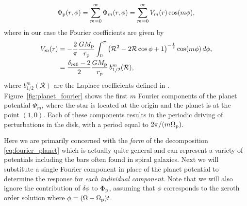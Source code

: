 \begin{align}
    \Phi_{\rm p}(r,\phi) = \sum_{m=0}^\infty \Phi_m (r,\phi) = \sum_{m=0}^\infty V_m (r) \cos (m \phi), \label{eq:fourier_planet}
\end{align}
where in our case the Fourier coefficients are given by 
\begin{align}
    V_m (r) &= - \frac{2}{\pi} \frac{G M_{\rm p}}{r_{\rm p}} \int_0^\pi  \left( \mathcal{R}^2 - 2 \mathcal{R} \cos \phi + 1\right)^{-\frac{1}{2}} \cos (m \phi) \, d\phi, \\
    &= \frac{\delta_{m0} - 2}{2} \frac{G M_{\rm p}}{r_{\rm p}} \, b_{1/2}^m (\mathcal{R}),
\end{align}
where $b_{1/2}^m (\mathcal{R})$ are the Laplace coefficients defined in \citet{brouwer1961}.
Figure~\ref{fig:planet_fourier} shows the first $m$ Fourier components of the planet potential $\Phi_m$, where the star is located at the origin and the planet is at the point $(1,0)$.
Each of these components results in the periodic driving of perturbations in the disk, with a period equal to $2\pi / (m \Omega_{\rm p})$.

Here we are primarily concerned with the \textit{form} of the decomposition \eqref{eq:fourier_planet} which is actually quite general and can represent a variety of potentials including the bars often found in spiral galaxies.
Next we will substitute a single Fourier component in place of the planet potential to determine the response for \textit{each individual component}.
Note that we will also ignore the contribution of $\delta \phi$ to $\Phi_{\rm p}$, assuming that $\phi$ corresponds to the zeroth order solution where $\phi = (\Omega - \Omega_{\rm p}) t$. 

